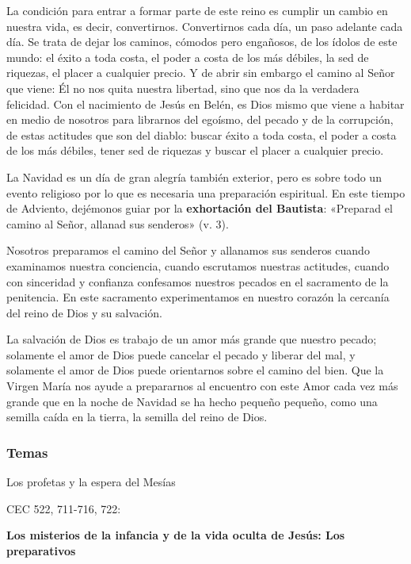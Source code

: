 \documentclass[]{article}
\begin{document}
La condición para entrar a formar parte de este reino es cumplir un
cambio en nuestra vida, es decir, convertirnos. Convertirnos cada día,
un paso adelante cada día. Se trata de dejar los caminos, cómodos pero
engañosos, de los ídolos de este mundo: el éxito a toda costa, el poder
a costa de los más débiles, la sed de riquezas, el placer a cualquier
precio. Y de abrir sin embargo el camino al Señor que viene: Él no nos
quita nuestra libertad, sino que nos da la verdadera felicidad. Con el
nacimiento de Jesús en Belén, es Dios mismo que viene a habitar en medio
de nosotros para librarnos del egoísmo, del pecado y de la corrupción,
de estas actitudes que son del diablo: buscar éxito a toda costa, el
poder a costa de los más débiles, tener sed de riquezas y buscar el
placer a cualquier precio.

La Navidad es un día de gran alegría también exterior, pero es sobre
todo un evento religioso por lo que es necesaria una preparación
espiritual. En este tiempo de Adviento, dejémonos guiar por la
\textbf{exhortación del Bautista}: «Preparad el camino al Señor, allanad
sus senderos» (v. 3).

Nosotros preparamos el camino del Señor y allanamos sus senderos cuando
examinamos nuestra conciencia, cuando escrutamos nuestras actitudes,
cuando con sinceridad y confianza confesamos nuestros pecados en el
sacramento de la penitencia. En este sacramento experimentamos en
nuestro corazón la cercanía del reino de Dios y su salvación.

La salvación de Dios es trabajo de un amor más grande que nuestro
pecado; solamente el amor de Dios puede cancelar el pecado y liberar del
mal, y solamente el amor de Dios puede orientarnos sobre el camino del
bien. Que la Virgen María nos ayude a prepararnos al encuentro con este
Amor cada vez más grande que en la noche de Navidad se ha hecho pequeño
pequeño, como una semilla caída en la tierra, la semilla del reino de
Dios.

\protect\hypertarget{_Toc448662732}{}{\protect\hypertarget{_Toc448690251}{}{}}

\subsubsection{Temas}\label{temas-1}

Los profetas y la espera del Mesías

CEC 522, 711-716, 722:

\textbf{Los misterios de la infancia y de la vida oculta de Jesús: Los
preparativos}
\end{document}
